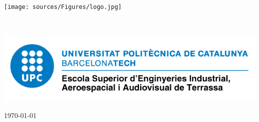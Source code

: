 \begin{minipage}{0.45\textwidth}
\begin{flushleft}
    \texttt{[image: sources/Figures/logo.jpg]}%
\end{flushleft}
\end{minipage}
~
\begin{minipage}{0.45\textwidth}
\begin{flushright}
    \includegraphics[scale=0.35]{Figures/logo_eseiaat.png}%
\end{flushright}
\end{minipage}

\vspace{1.5cm}


{\large \today}\\[2cm] %


\vfill %
